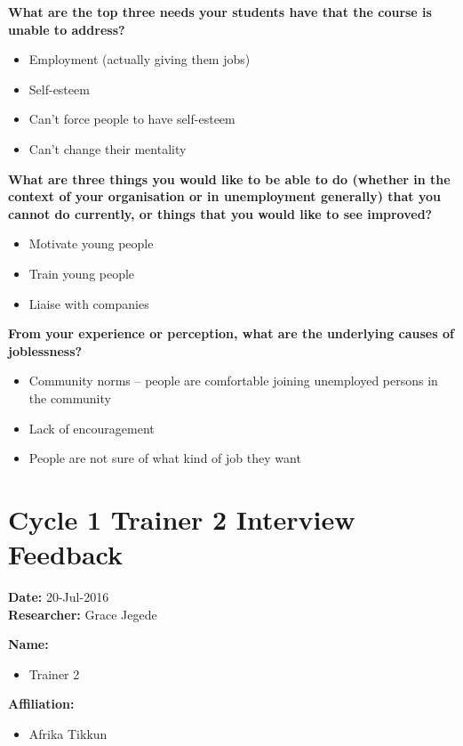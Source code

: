 \noindent\textbf{What are the top three needs your students have that the course is unable to address?}
\begin{itemize}
\item Employment (actually giving them jobs)
\item Self-esteem
\item Can’t force people to have self-esteem
\item Can’t change their mentality
\end{itemize}

\noindent\textbf{What are three things you would like to be able to do (whether in the context of your organisation or in unemployment generally) that you cannot do currently, or things that you would like to see improved?}
\begin{itemize}
\item Motivate young people
\item Train young people
\item Liaise with companies
\end{itemize}

\noindent\textbf{From your experience or perception, what are the underlying causes of joblessness?}
\begin{itemize}
\item Community norms – people are comfortable joining unemployed persons in the community
\item Lack of encouragement
\item People are not sure of what kind of job they want
\end{itemize}

\section{Cycle 1 Trainer 2 Interview Feedback}

\noindent\textbf{Date:} 20-Jul-2016 \\
\noindent\textbf{Researcher:} Grace Jegede



\noindent\textbf{Name:}
\begin{itemize}
\item Trainer 2
\end{itemize}

\noindent\textbf{Affiliation:}
\begin{itemize}
\item Afrika Tikkun
\end{itemize}

